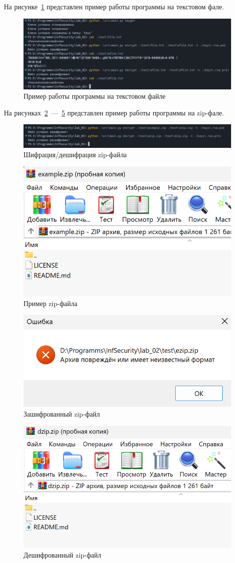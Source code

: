 На рисунке~\ref{fig:tex} представлен пример работы программы на текстовом фале.

\begin{figure}[h]
    \centering
    \includegraphics[width=1\linewidth]{images/tex.png}
    \caption{Пример работы программы на текстовом файле}
    \label{fig:tex}
\end{figure}

На рисунках~\ref{fig:zex}~---~\ref{fig:zd} представлен пример работы программы на zip-фале.

\begin{figure}[h]
    \centering
    \includegraphics[width=0.9\linewidth]{images/zex.png}
    \caption{Шифрация/дешифрация zip-файла}
    \label{fig:zex}
\end{figure}

\begin{figure}[h]
    \centering
    \includegraphics[width=0.6\linewidth]{images/fzip.png}
    \caption{Пример zip-файла}
    \label{fig:z1}
\end{figure}

\begin{figure}[h]
    \centering
    \includegraphics[width=0.6\linewidth]{images/ezip.png}
    \caption{Зашифрованный zip-файл}
    \label{fig:ze}
\end{figure}

\begin{figure}[h]
    \centering
    \includegraphics[width=0.6\linewidth]{images/dzip.png}
    \caption{Дешифрованный zip-файл}
    \label{fig:zd}
\end{figure}
